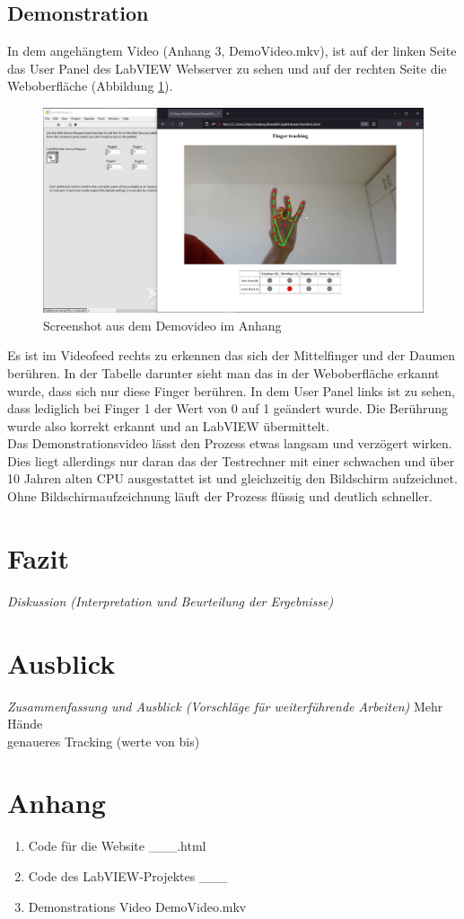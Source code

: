 \documentclass[a4paper,12pt,final]{article} %
\numberwithin{equation}{section} %
\numberwithin{figure}{section} %
\numberwithin{table}{section} %
\begin{document}
\subsection{Demonstration}
In dem angehängtem Video (Anhang 3, DemoVideo.mkv), ist auf der linken Seite das User Panel des LabVIEW Webserver zu sehen und auf der rechten Seite die Weboberfläche (Abbildung \ref{fig:ScreenshotVideo}).
\begin{figure}[H]
	\begin{center}
		\includegraphics[width=12cm]{Bilder/ScreenshotVideo.png}
		\caption{Screenshot aus dem Demovideo im Anhang}
		\label{fig:ScreenshotVideo}
	\end{center}
\end{figure}
Es ist im Videofeed rechts zu erkennen das sich der Mittelfinger und der Daumen berühren. In der Tabelle darunter sieht man das in der Weboberfläche erkannt wurde, dass sich nur diese Finger berühren.
In dem User Panel links ist zu sehen, dass lediglich bei Finger 1 der Wert von 0 auf 1 geändert wurde. Die Berührung wurde also korrekt erkannt und an LabVIEW übermittelt.\\
Das Demonstrationsvideo lässt den Prozess etwas langsam und verzögert wirken. Dies liegt allerdings nur daran das der Testrechner mit einer schwachen und über 10 Jahren alten CPU ausgestattet ist und gleichzeitig den Bildschirm aufzeichnet. 
Ohne Bild\-schirm\-auf\-zeich\-nung läuft der Prozess flüssig und deutlich schneller. 
\newpage
\section{Fazit}
\emph{Diskussion (Interpretation und Beurteilung der Ergebnisse)}
\newpage
\section{Ausblick}
\emph{Zusammenfassung und Ausblick (Vorschläge für weiterführende Arbeiten)}
Mehr Hände\\
genaueres Tracking (werte von bis)
\newpage
{}
{} %
\printbibliography  %
\newpage
\section*{Anhang} 
\begin{enumerate}
	\item Code für die Website \_\_\_.html
	\item Code des LabVIEW-Projektes \_\_\_
	\item Demonstrations Video DemoVideo.mkv
\end{enumerate}
\newpage
\end{document}
